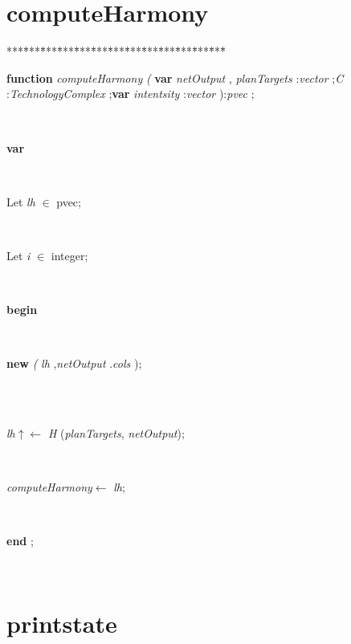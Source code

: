\section{computeHarmony}\label{sec:harmony/balancePlancomputeHarmony}

\begin{tabbing}
***\=***\=***\=***\=***\=***\=***\=***\=***\=***\=***\=***\=***\=\kill
\parbox{14cm}{\textsf{\textbf{function}   \textit{computeHarmony}  \textit{(} \textbf{var}  \textit{netOutput} ,  \textit{planTargets} :\textit{vector} ;\textit{C} :\textit{TechnologyComplex}  ;\textbf{var}   \textit{intentsity} :\textit{vector}  ):\textit{pvec} ;}}\\
\+\parbox{14cm}{\textsf{\textbf{var} }}\\
\parbox{14cm}{\textsf{Let \textit{lh} $\in$ pvec;}}\\
\parbox{14cm}{\textsf{Let \textit{i} $\in$ integer;}}\\
\-\<\+\parbox{14cm}{\textsf{\textbf{begin} }}\\
\parbox{14cm}{\textsf{\textbf{new} \textit{(} \textit{lh} ,\textit{netOutput} .\textit{cols} );}}\\
\\
\parbox{14cm}{\textsf{\textit{lh}$\uparrow$\textit{}$\leftarrow$ \textit{H} (\textit{planTargets}, \textit{netOutput})}; }\\
\parbox{14cm}{\textsf{\textit{computeHarmony}$\leftarrow$ \textit{lh}}; }\\
\<\-\parbox{14cm}{\textsf{\textbf{end} ;}}\\
\end{tabbing}
\section{printstate}\label{sec:harmony/balancePlanprintstate}


